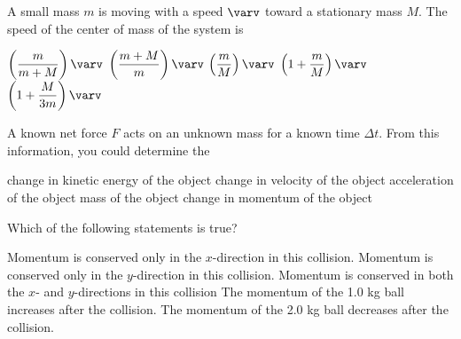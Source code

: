 \documentclass{../../../oss-apphys-exam}
\begin{document}
\begin{multicols*}{2}
\begin{questions}
    \question A small mass $m$ is moving with a speed $\varv$ toward a
    stationary mass $M$. The speed of the center of mass of the system is
    \begin{choices}
      \choice $\left(\dfrac{m}{m+M}\right)\varv$
      \choice $\left(\dfrac{m+M}{m}\right)\varv$
      \choice $\left(\dfrac{m}{M}\right)\varv$
      \choice $\left(1+\dfrac{m}{M}\right)\varv$
      \choice $\left(1+\dfrac{M}{3m}\right)\varv$
    \end{choices}

    \question A known net force $F$ acts on an unknown mass for a known time
    $\Delta t$. From this information, you could determine the
    \begin{choices}
      \choice change in kinetic energy of the object
      \choice change in velocity of the object
      \choice acceleration of the object
      \choice mass of the object
      \choice change in momentum of the object
    \end{choices}
    

    \question Which of the following statements is true?
    \label{bfa1}
    \begin{choices}    
      \choice Momentum is conserved only in the $x$-direction in this collision.
      \choice Momentum is conserved only in the $y$-direction in this collision.
      \choice Momentum is conserved in both the $x$- and $y$-directions in this
      collision
      \choice The momentum of the 1.0 kg ball increases after the collision.
      \choice The momentum of the 2.0 kg ball decreases after the collision.
    \end{choices}
    

\end{questions}
\end{multicols*}
\end{document}
